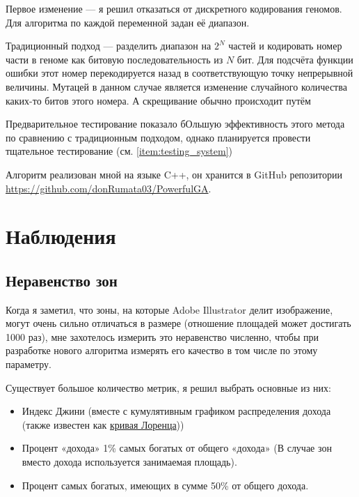 \documentclass[11pt]{article}
\begin{document}
    Первое изменение — я решил отказаться от дискретного кодирования геномов.
    Для алгоритма по каждой переменной задан её диапазон.

    Традиционный подход — разделить диапазон на $2^N$ частей и кодировать номер части в геноме как битовую последовательность из $N$ бит.
    Для подсчёта функции ошибки этот номер перекодируется назад в соответствующую точку непрерывной величины.
    Мутацей в данном случае является изменение случайного количества каких-то битов этого номера.
    А скрещивание обычно происходит путём

    Предварительное тестирование показало бОльшую эффективность этого метода по сравнению с традиционным подходом, однако планируется провести тщательное тестирование (см. \ref{item:testing_system})

    Алгоритм реализован мной на языке C++, он хранится в GitHub репозитории \href{https://github.com/donRumata03/PowerfulGA}{https://github.com/donRumata03/PowerfulGA}.

    \section{Наблюдения}\label{sec:observations}

    \subsection{Неравенство зон}\label{subsec:inequality}
    Когда я заметил, что зоны, на которые Adobe Illustrator делит изображение, могут очень сильно отличаться в размере (отношение площадей может достигать 1000 раз),
    мне захотелось измерить это неравенство численно, чтобы при разработке нового алгоритма измерять его качество в том числе по этому параметру.

    Существует большое количество метрик, я решил выбрать основные из них:
    \begin{itemize}
        \item Индекс Джини (вместе с кумулятивным графиком распределения дохода (также известен как \href{https://en.wikipedia.org/wiki/Lorenz_curve}{кривая Лоренца}))
        \item Процент «дохода» 1\% самых богатых от общего «дохода» (В случае зон вместо дохода используется занимаемая площадь).
        \item Процент самых богатых, имеющих в сумме 50\% от общего дохода.
    \end{itemize}
\end{document}
